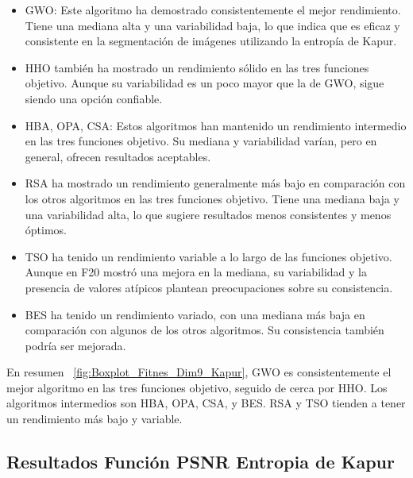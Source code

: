 \documentclass[conference]{IEEEtran}
\begin{document}
\begin{itemize}

\item GWO: Este algoritmo ha demostrado consistentemente el mejor rendimiento. Tiene una mediana alta y una variabilidad baja, lo que indica que es eficaz y consistente en la segmentación de imágenes utilizando la entropía de Kapur.

\item HHO también ha mostrado un rendimiento sólido en las tres funciones objetivo. Aunque su variabilidad es un poco mayor que la de GWO, sigue siendo una opción confiable.

\item HBA, OPA, CSA: Estos algoritmos han mantenido un rendimiento intermedio en las tres funciones objetivo. Su mediana y variabilidad varían, pero en general, ofrecen resultados aceptables.

\item RSA ha mostrado un rendimiento generalmente más bajo en comparación con los otros algoritmos en las tres funciones objetivo. Tiene una mediana baja y una variabilidad alta, lo que sugiere resultados menos consistentes y menos óptimos.

\item TSO ha tenido un rendimiento variable a lo largo de las funciones objetivo. Aunque en F20 mostró una mejora en la mediana, su variabilidad y la presencia de valores atípicos plantean preocupaciones sobre su consistencia.

\item BES ha tenido un rendimiento variado, con una mediana más baja en comparación con algunos de los otros algoritmos. Su consistencia también podría ser mejorada.
\end{itemize}
\noindent En resumen ~\ref{fig:Boxplot_Fitnes_Dim9_Kapur}, GWO es consistentemente el mejor algoritmo en las tres funciones objetivo, seguido de cerca por HHO. Los algoritmos intermedios son HBA, OPA, CSA, y BES. RSA y TSO tienden a tener un rendimiento más bajo y variable.
\subsection{Resultados Función PSNR Entropia de Kapur}
\end{document}

